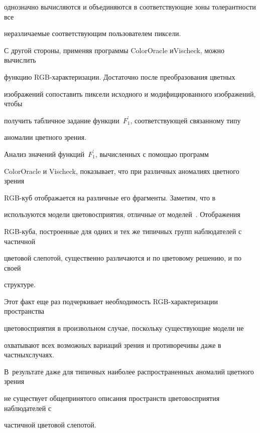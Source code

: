 однозначно вычисляются и объединяются в соответствующие зоны толерантности все


неразличаемые соответствующим пользователем пиксели.





С другой стороны, применяя программы ColorOracle и\linebreak Vischeck, можно вычислить


функцию RGB-характеризации. Достаточно после преобразования цветных


изображений сопоставить пиксели исходного и модифицированного изображений, что\-бы


получить табличное задание функции~$F^\prime_1$, соответствующей связанному типу


аномалии цветного зрения.





Анализ значений функций~$F^\prime_1$, вычисленных с помощью программ


ColorOracle и Vischeck, показывает, что при различных аномалиях цветного зрения


RGB-куб отображается на различные его фрагменты. Заметим, что в~\cite{3-6}


используются модели цветовосприятия, отличные от моделей~\cite{2-6}. Отображения


RGB-ку\-ба, построенные для одних и тех же типичных групп наблюдателей с частичной


цветовой слепотой, существенно различаются и по цветовому решению, и по своей


структуре.





Этот факт еще раз подчеркивает необходимость RGB-ха\-рак\-те\-ри\-за\-ции пространства


цветовосприятия в произвольном случае, поскольку существующие модели не


охватывают всех воз\-мож\-ных вариаций зрения и противоречивы даже в частных\linebreak случаях.


В~результате даже для типичных наиболее распространенных аномалий цветного зрения


не существует общепринятого описания пространств цветовосприятия наблюдателей с


частичной цветовой слепотой.








